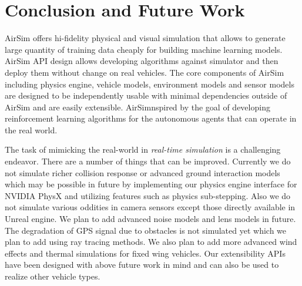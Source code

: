 \documentclass[graybox]{svmult}
\begin{document}

\section{Conclusion and Future Work}
AirSim offers hi-fidelity physical and visual simulation that allows to generate large quantity of training data cheaply for building machine learning models. AirSim API design allows developing algorithms against simulator and then deploy them without change on real vehicles. The core components of AirSim including physics engine, vehicle models, environment models and sensor models are designed to be independently usable with minimal dependencies outside of AirSim and are easily extensible. AirSimnspired by the goal of developing reinforcement learning algorithms for the autonomous agents that can operate in the real world.

The task of mimicking the real-world in \emph{real-time simulation} is a challenging endeavor. There are a number of things that can be improved. Currently we do not simulate richer collision response or advanced ground interaction models which may be possible in future by implementing our physics engine interface for NVIDIA PhysX and utilizing features such as physics sub-stepping. Also we do not simulate various oddities in camera sensors except those directly available in Unreal engine. We plan to add advanced noise models and lens models in future. The degradation of GPS signal due to obstacles is not simulated yet which we plan to add using ray tracing methods. We also plan to add more advanced wind effects and thermal simulations for fixed wing vehicles. Our extensibility APIs have been designed with above future work in mind and can also be used to realize other vehicle types.


{\footnotesize
	}
\end{document}
